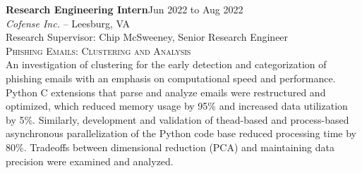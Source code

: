 \documentclass[hidelinks, 10pt]{article}
\begin{document}
{{\begin{minipage}[ct]{0.9\linewidth}
\textbf{Research Engineering Intern}\hfill Jun 2022 to Aug 2022\\
\emph{Cofense Inc.} -- Leesburg, VA\\
Research Supervisor: Chip McSweeney, Senior Research Engineer\\
{\textsc{Phishing Emails: Clustering and Analysis}}
\vspace{1mm}\\
An investigation of clustering for the early detection and categorization of
phishing emails with an emphasis on computational speed and performance.  Python
C extensions that parse and analyze emails were restructured and optimized,
which reduced memory usage by 95\% and increased data utilization by 5\%.
Similarly, development and validation of thead-based and process-based
asynchronous parallelization of the Python code base reduced processing time by
80\%. Tradeoffs between dimensional reduction (PCA) and maintaining data
precision were examined and analyzed.
\end{minipage}

\vspace{4mm}

}}
\end{document}
